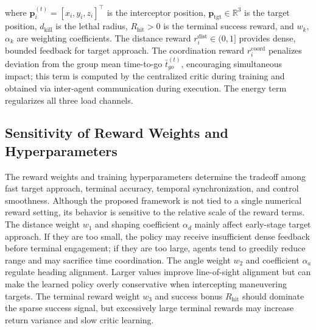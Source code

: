\documentclass[lettersize,journal]{IEEEtran}
\providecommand{\DIFadd}[1]{{\protect\color{blue} #1}} %
\providecommand{\DIFdel}[1]{} %
\providecommand{\DIFaddbegin}{} %
\providecommand{\DIFaddend}{} %
\providecommand{\DIFdelbegin}{} %
\providecommand{\DIFdelend}{} %
\begin{document}
where \DIFdelbegin \DIFdel{$\mathbf{p}_i^{(t)} = [x_i, y_i]^\top$ }\DIFdelend \DIFaddbegin \DIFadd{$\mathbf{p}_i^{(t)} = [x_i,y_i,z_i]^\top$ }\DIFaddend is the interceptor
position, \DIFdelbegin \DIFdel{$\mathbf{p}_{\text{tgt}}$ }\DIFdelend \DIFaddbegin \DIFadd{$\mathbf{p}_{\text{tgt}}\in\mathbb R^3$ }\DIFaddend is the target position,
$d_{\text{kill}}$ is the lethal radius, $R_{\text{hit}} > 0$ is the terminal
success reward, and $w_k$, $\alpha_k$ are weighting coefficients. The distance
reward $r_i^{\text{dist}} \in (0,1]$ provides dense, bounded feedback for target
approach. The coordination reward $r_i^{\text{coord}}$ penalizes deviation from
the group mean time-to-go $\bar{t}_{go}^{(t)}$, encouraging simultaneous impact;
this term is computed by the centralized critic during training and obtained
via inter-agent communication during execution. The energy term \DIFdelbegin \DIFdel{$r_i^{\text{energy}}$ regularizes
control effort to prevent actuator saturation}\DIFdelend \DIFaddbegin \DIFadd{regularizes
all three load channels}\DIFaddend .

\subsection{Sensitivity of Reward Weights and Hyperparameters}
\label{subsec:reward_sensitivity}

The reward weights and training hyperparameters determine the tradeoff among fast target
approach, terminal accuracy, temporal synchronization, and control smoothness. Although the
proposed framework is not tied to a single numerical reward setting, its behavior is sensitive
to the relative scale of the reward terms. The distance weight $w_1$ and shaping coefficient
$\alpha_d$ mainly affect early-stage target approach. If they are too small, the policy may
receive insufficient dense feedback before terminal engagement; if they are too large, agents
tend to greedily reduce range and may sacrifice time coordination. The angle weight $w_2$ and
coefficient $\alpha_a$ regulate heading alignment. Larger values improve line-of-sight
alignment but can make the learned policy overly conservative when intercepting maneuvering
targets. The terminal reward weight $w_3$ and success bonus $R_{\text{hit}}$ should dominate
the sparse success signal, but excessively large terminal rewards may increase return variance
and slow critic learning.
\end{document}
